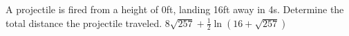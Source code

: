 {A projectile is fired from a height of 0ft, landing 16ft away in 4s.  Determine the total distance the projectile traveled.
}
{$8\sqrt{257} + \frac{1}{2} \ln\left(16 + \sqrt{257} \right)$
}